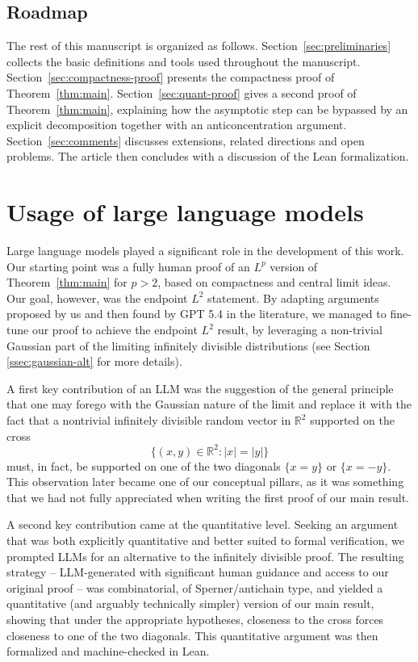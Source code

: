 \documentclass[11pt]{amsart}
\numberwithin{equation}{section}
\theoremstyle{definition}
\theoremstyle{remark}
\newcommand{\R}{\mathbb R}
\begin{document}
\subsection{Roadmap}
The rest of this manuscript is organized as follows.   Section~\ref{sec:preliminaries} collects
the basic definitions and tools used throughout the manuscript. 
Section~\ref{sec:compactness-proof}  presents the compactness proof of
Theorem~\ref{thm:main}.  Section~\ref{sec:quant-proof} gives a second proof of
Theorem~\ref{thm:main}, explaining how the asymptotic step can be bypassed by an
explicit decomposition together with an anticoncentration argument.
Section~\ref{sec:comments} discusses extensions, related directions
and open problems. The article then concludes with a discussion of the Lean formalization.  

\section*{Usage of large language models} 

Large language models played a significant role in the development of this work. Our starting point was a fully human proof of an $L^p$ version of Theorem~\ref{thm:main}  for $p> 2$, based on compactness and central limit ideas. Our goal, however, was the endpoint $L^2$ statement. By adapting arguments proposed by us and then found by GPT 5.4 in the literature, we managed to fine-tune our proof to achieve the endpoint $L^2$ result, by leveraging a non-trivial Gaussian part of the limiting infinitely divisible distributions (see Section \ref{ssec:gaussian-alt} for more details). 

A first key contribution of an LLM was the suggestion of the general principle that one may forego with the Gaussian nature of the limit and replace it with the fact that a nontrivial infinitely divisible random vector in $\R^2$ supported on the cross 
$$\{ (x,y) \in \R^2 \colon |x| = |y|\}$$
must, in fact, be supported on one of the two diagonals $\{x=y\}$ or $\{x=-y\}.$ This observation later became one of our conceptual pillars, as it was something that we had not fully appreciated when writing the first proof of our main result.

A second key contribution came at the quantitative level. Seeking an argument that was both explicitly quantitative and better suited  to formal verification, we prompted LLMs for an alternative to the infinitely divisible proof. The resulting strategy -- LLM-generated with significant human guidance and access to our original proof -- was combinatorial, of Sperner/antichain type, and yielded a quantitative (and arguably technically simpler) version of our main result, showing that under the appropriate hypotheses, closeness to the cross forces closeness to one of the two diagonals. This quantitative argument was then formalized and machine-checked in Lean. 
\end{document}
